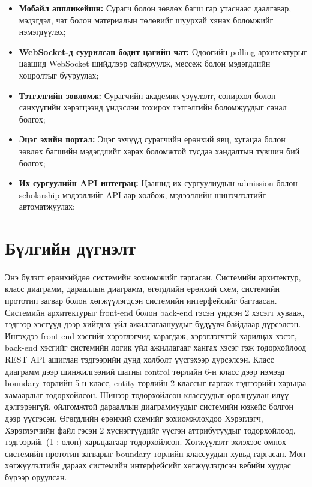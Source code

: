 \begin{itemize}
    \item \textbf{Мобайл аппликейшн:} Сурагч болон зөвлөх багш гар утаснаас
    даалгавар, мэдэгдэл, чат болон материалын төлөвийг шуурхай хянах
    боломжийг нэмэгдүүлэх;

    \item \textbf{WebSocket-д суурилсан бодит цагийн чат:} Одоогийн polling
    архитектурыг цаашид WebSocket шийдлээр сайжруулж, мессеж болон
    мэдэгдлийн хоцролтыг бууруулах;

    \item \textbf{Тэтгэлгийн зөвлөмж:} Сурагчийн академик үзүүлэлт,
    сонирхол болон санхүүгийн хэрэгцээнд үндэслэн тохирох тэтгэлгийн
    боломжуудыг санал болгох;

    \item \textbf{Эцэг эхийн портал:} Эцэг эхчүүд сурагчийн ерөнхий явц,
    хугацаа болон зөвлөх багшийн мэдэгдлийг харах боломжтой тусдаа
    хандалтын түвшин бий болгох;

    \item \textbf{Их сургуулийн API интеграц:} Цаашид их сургуулиудын
    admission болон scholarship мэдээллийг API-аар холбож, мэдээллийн
    шинэчлэлтийг автоматжуулах;

\end{itemize}


\section{Бүлгийн дүгнэлт}
\paragraph{} Энэ бүлэгт ерөнхийдөө системийн зохиомжийг гаргасан. Системийн архитектур, класс диаграмм, дарааллын диаграмм, өгөгдлийн ерөнхий схем, системийн прототип загвар болон хөгжүүлэгдсэн системийн интерфейсийг багтаасан. Системийн архитектурыг front-end болон back-end гэсэн үндсэн 2 хэсэгт хувааж, тэдгээр хэсгүүд дээр хийгдэх үйл ажиллагаануудыг бүдүүвч байдлаар дүрсэлсэн. Ингэхдээ front-end хэсгийг хэрэглэгчид харагдаж, хэрэглэгчтэй харилцах хэсэг, back-end хэсгийг системийн логик үйл ажиллагааг хангах хэсэг гэж тодорхойлоод REST API ашиглан тэдгээрийн дунд холболт үүсгэхээр дүрсэлсэн. Класс диаграмм дээр шинжилгээний шатны control төрлийн 6-н класс дээр нэмээд boundary төрлийн 5-н класс, entity төрлийн 2 классыг гаргаж тэдгээрийн харьцаа хамаарлыг тодорхойлсон. Шинээр тодорхойлсон классуудыг оролцуулан илүү дэлгэрэнгүй, ойлгомжтой дарааллын диаграммуудыг системийн юзкейс болгон дээр үүсгэсэн. Өгөгдлийн ерөнхий схемийг зохиомжлохдоо Хэрэглэгч, Хэрэглэгчийн файл гэсэн 2 хүснэгтүүдийг үүсгэн аттрибутуудыг тодорхойлоод, тэдгээрийг (1 : олон) харьцаагаар тодорхойлсон. Хөгжүүлэлт эхлэхээс өмнөх системийн прототип загварыг boundary төрлийн классуудын хувьд гаргасан. Мөн хөгжүүлэлтийн дараах системийн интерфейсийг хөгжүүлэгдсэн вебийн хуудас бүрээр оруулсан. 
